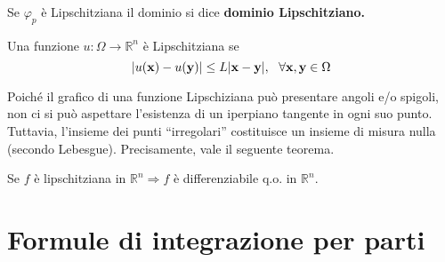 Se $\varphi _{p}$ è Lipschitziana il dominio si dice \textbf{dominio Lipschitziano.}
\begin{definition}
     Una funzione $u:\Omega \rightarrow \mathbb{R}^{n}$ è Lipschitziana se
    \begin{equation*}
        | u(\mathbf{x}) -u(\mathbf{y})| \leq L|\mathbf{x}-\mathbf{y}|,\ \ \forall \mathbf{x},\mathbf{y}\in \Omega
    \end{equation*}
\end{definition}
Poiché il grafico di una funzione Lipschiziana può presentare angoli e/o spigoli, non ci si può aspettare l’esistenza di un iperpiano tangente in ogni suo punto. Tuttavia, l’insieme dei punti ``irregolari'' costituisce un insieme di misura nulla (secondo Lebesgue). Precisamente, vale il seguente teorema.
\begin{theorem}
    [di Rademacher] Se $f$ è lipschitziana in $\mathbb{R}^{n} \Rightarrow f$ è differenziabile q.o. in $\mathbb{R}^{n}$.
\end{theorem}
\section{Formule di integrazione per parti}

